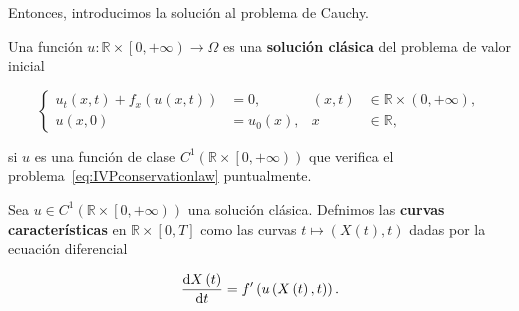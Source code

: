 Entonces, introducimos la solución al problema de Cauchy.

\begin{definition}
  Una función
  \begin{math}
    u\colon\mathbb{R}\times
    \left[0,+\infty\right)\to
    \Omega
  \end{math}
  es una \textbf{solución clásica} del problema de valor inicial

  \begin{equation}\label{eq:IVPconservationlaw}
    \left\{
    \begin{aligned}
      u_{t}
      \left(x,t\right)+
      f_{x}
      \left(u\left(x,t\right)\right) & =
      0,
                                     &
      \left(x,t\right)               & \in
      \mathbb{R}\times
      \left(0,+\infty\right),                         \\
      u\left(x,0\right)              & =
      u_{0}\left(x\right),           &
      x                              & \in\mathbb{R},
    \end{aligned}
    \right.
  \end{equation}

  si $u$ es una función de clase
  \begin{math}
    C^{1}
    \left(
    \mathbb{R}\times
    \left[0,+\infty\right)
    \right)
  \end{math}
  que verifica el problema~\eqref{eq:IVPconservationlaw}
  puntualmente.
\end{definition}

\begin{definition}
  Sea
  \begin{math}
    u\in C^{1}
    \left(
    \mathbb{R}\times
    \left[0,+\infty\right)
    \right)
  \end{math}
  una solución clásica.
  Defnimos las \textbf{curvas características} en
  \begin{math}
    \mathbb{R}\times
    \left[0,T\right]
  \end{math}
  como las curvas
  \begin{math}
    t\longmapsto
    \left(
    X\left(t\right),t
    \right)
  \end{math}
  dadas por la ecuación diferencial

  \begin{equation}\label{eq:characteristicsystem}
    \diff{X\left(t\right)}{t}=
    f^{\prime}
    \left(
    u\left(X\left(t\right),t\right)
    \right).
  \end{equation}
\end{definition}

